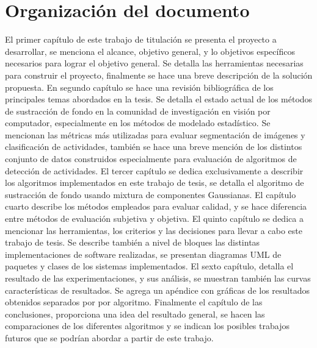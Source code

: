 \section{Organización del documento}

El primer capítulo de este trabajo de titulación se presenta el proyecto a desarrollar, se menciona el alcance, objetivo general, y lo objetivos específicos necesarios para lograr el objetivo general. Se detalla las herramientas necesarias para construir el proyecto, finalmente se hace una breve descripción de la solución propuesta. En segundo capítulo se hace una revisión bibliográfica de los principales temas abordados en la tesis. Se detalla el estado actual de los métodos de sustracción de fondo en la comunidad de investigación en visión por computador, especialmente en los métodos de modelado estadístico. Se mencionan las métricas más utilizadas para evaluar segmentación de imágenes y clasificación de actividades, también se hace una breve mención de los distintos conjunto de datos construidos especialmente para evaluación de algoritmos de detección de actividades. El tercer capítulo se dedica exclusivamente a describir los algoritmos implementados en este trabajo de tesis, se detalla el algoritmo de sustracción de fondo usando mixtura de componentes Gaussianas. El capítulo cuarto describe los métodos empleados para evaluar calidad, y se hace diferencia entre métodos de evaluación subjetiva y objetiva. El quinto capítulo se dedica a mencionar las herramientas, los criterios y las decisiones para llevar a cabo este trabajo de tesis. Se describe también a nivel de bloques las distintas implementaciones de software realizadas, se presentan diagramas UML de paquetes y clases de los sistemas implementados. El sexto capítulo, detalla el resultado de las experimentaciones, y sus análisis, se muestran también las curvas características de resultados. Se agrega un apéndice con gráficas de los resultados obtenidos separados por  por algoritmo. Finalmente el capítulo de las conclusiones, proporciona una idea del resultado general, se hacen las comparaciones de los diferentes algoritmos y se indican los posibles trabajos futuros que se podrían abordar a partir de este trabajo.



